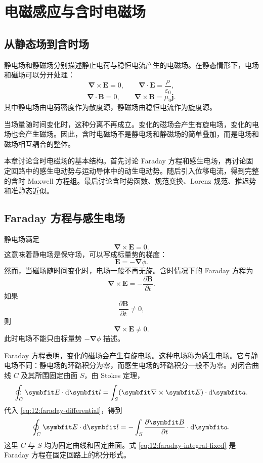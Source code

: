 \chapter{电磁感应与含时电磁场}

\section{从静态场到含时场}

静电场和静磁场分别描述静止电荷与稳恒电流产生的电磁场。在静态情形下，电场和磁场可以分开处理：
\[
\bm{\nabla}\times\bm{E}=0,
\qquad
\bm{\nabla}\cdot\bm{E}=\frac{\rho}{\varepsilon_{0}},
\]
\[
\bm{\nabla}\cdot\bm{B}=0,
\qquad
\bm{\nabla}\times\bm{B}=\mu_{0}\bm{j}.
\]
其中静电场由电荷密度作为散度源，静磁场由稳恒电流作为旋度源。

当场量随时间变化时，这种分离不再成立。变化的磁场会产生有旋电场，变化的电场也会产生磁场。因此，含时电磁场不是静电场和静磁场的简单叠加，而是电场和磁场相互耦合的整体。

本章讨论含时电磁场的基本结构。首先讨论 Faraday 方程和感生电场，再讨论固定回路中的感生电动势与运动导体中的动生电动势。随后引入位移电流，得到完整的含时 Maxwell 方程组。最后讨论含时势函数、规范变换、Lorenz 规范、推迟势和准静态近似。

\section{Faraday 方程与感生电场}

静电场满足
\[
\bm{\nabla}\times\bm{E}=0.
\]
这意味着静电场是保守场，可以写成标量势的梯度：
\[
\bm{E}=-\bm{\nabla}\phi.
\]
然而，当磁场随时间变化时，电场一般不再无旋。含时情况下的 Faraday 方程为
\begin{equation}
	\bm{\nabla}\times\bm{E}
	=
	-\frac{\partial\bm{B}}{\partial t}.
	\label{eq:12:faraday-differential}
\end{equation}
如果
\[
\frac{\partial\bm{B}}{\partial t}\neq 0,
\]
则
\[
\bm{\nabla}\times\bm{E}\neq 0.
\]
此时电场不能只由标量势 $-\bm{\nabla}\phi$ 描述。

Faraday 方程表明，变化的磁场会产生有旋电场。这种电场称为感生电场。它与静电场不同：静电场的环路积分为零，而感生电场的环路积分一般不为零。对闭合曲线 $C$ 及其所围固定曲面 $S$，由 Stokes 定理，
\[
\oint_{C}\bm{E}\cdot\dif\bm{l}
=
\int_{S}
(\bm{\nabla}\times\bm{E})\cdot\dif\bm{a}.
\]
代入 \eqref{eq:12:faraday-differential}，得到
\begin{equation}
	\oint_{C}\bm{E}\cdot\dif\bm{l}
	=
	-\int_{S}
	\frac{\partial\bm{B}}{\partial t}
	\cdot\dif\bm{a}.
	\label{eq:12:faraday-integral-fixed}
\end{equation}
这里 $C$ 与 $S$ 均为固定曲线和固定曲面。式 \eqref{eq:12:faraday-integral-fixed} 是 Faraday 方程在固定回路上的积分形式。

